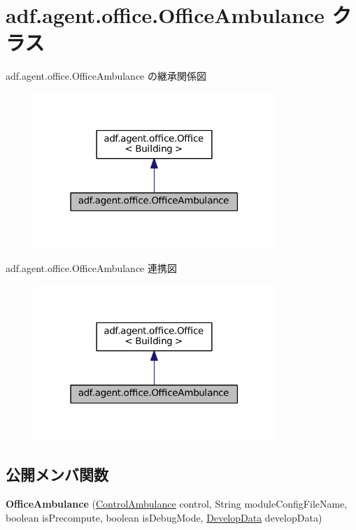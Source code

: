 \hypertarget{classadf_1_1agent_1_1office_1_1OfficeAmbulance}{}\section{adf.\+agent.\+office.\+Office\+Ambulance クラス}
\label{classadf_1_1agent_1_1office_1_1OfficeAmbulance}


adf.\+agent.\+office.\+Office\+Ambulance の継承関係図
\nopagebreak
\begin{figure}[H]
\begin{center}
\leavevmode
\includegraphics[width=259pt]{classadf_1_1agent_1_1office_1_1OfficeAmbulance__inherit__graph}
\end{center}
\end{figure}


adf.\+agent.\+office.\+Office\+Ambulance 連携図
\nopagebreak
\begin{figure}[H]
\begin{center}
\leavevmode
\includegraphics[width=259pt]{classadf_1_1agent_1_1office_1_1OfficeAmbulance__coll__graph}
\end{center}
\end{figure}
\subsection*{公開メンバ関数}
\begin{DoxyCompactItemize}
\item 
\hypertarget{classadf_1_1agent_1_1office_1_1OfficeAmbulance_a3b7c03ca26a66f374368ef1dcc2f5f56}{}\label{classadf_1_1agent_1_1office_1_1OfficeAmbulance_a3b7c03ca26a66f374368ef1dcc2f5f56} 
{\bfseries Office\+Ambulance} (\hyperlink{classadf_1_1component_1_1control_1_1ControlAmbulance}{Control\+Ambulance} control, String module\+Config\+File\+Name, boolean is\+Precompute, boolean is\+Debug\+Mode, \hyperlink{classadf_1_1agent_1_1develop_1_1DevelopData}{Develop\+Data} develop\+Data)
\end{DoxyCompactItemize}
